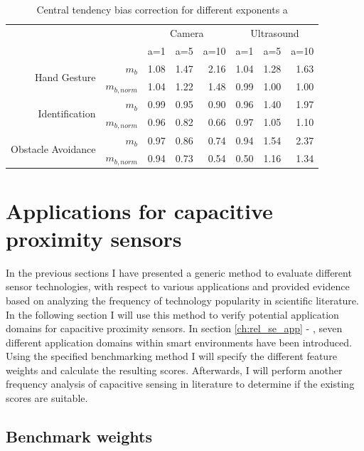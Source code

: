 \begin{table}[htbp]
  \centering
  \caption{Central tendency bias correction for different exponents a}
    \begin{tabular}{rrrrrrrr}
    \toprule
          &       & \multicolumn{3}{c}{Camera} & \multicolumn{3}{c}{Ultrasound} \\
          &       & a=1   & a=5   & a=10  & a=1   & a=5   & a=10 \\
    \midrule
    \multirow{2}[0]{*}{Hand Gesture} & $m_b$   & 1.08  & 1.47  & 2.16  & 1.04  & 1.28  & 1.63 \\
          & $m_{b,norm}$ & 1.04  & 1.22  & 1.48  & 0.99  & 1.00  & 1.00 \\
    \multirow{2}[0]{*}{Identification} & $m_b$   & 0.99  & 0.95  & 0.90  & 0.96  & 1.40  & 1.97 \\
          & $m_{b,norm}$ & 0.96  & 0.82  & 0.66  & 0.97  & 1.05  & 1.10 \\
    \multirow{2}[0]{*}{Obstacle Avoidance} & $m_b$  & 0.97  & 0.86  & 0.74  & 0.94  & 1.54  & 2.37 \\
          & $m_{b,norm}$ & 0.94  & 0.73  & 0.54  & 0.50  & 1.16  & 1.34 \\
    \bottomrule
    \end{tabular}%

  \label{tab:bench_bias_corr}%
\end{table}%


\section{Applications for capacitive proximity sensors}
In the previous sections I have presented a generic method to evaluate different sensor technologies, with respect to various applications and provided evidence based on analyzing the frequency of technology popularity in scientific literature. In the following section I will use this method to verify potential application domains for capacitive proximity sensors. In section \ref{ch:rel_se_app} - \emph{}, seven different application domains within smart environments have been introduced. Using the specified benchmarking method I will specify the different feature weights and calculate the resulting scores. Afterwards, I will perform another frequency analysis of capacitive sensing in literature to determine if the existing scores are suitable. 

\subsection{Benchmark weights}

